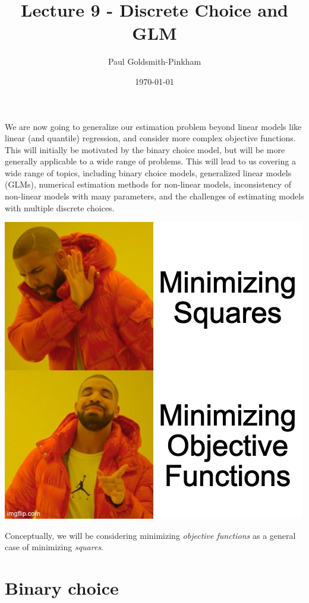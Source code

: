 \documentclass{tufte-handout}
\title{Lecture 9 - Discrete Choice and GLM}
\author{Paul Goldsmith-Pinkham}
\date{\today}
\theoremstyle{break}
\begin{document}
\maketitle


We are now going to generalize our estimation problem beyond linear models like linear (and quantile) regression, and consider more complex objective functions. This will initially be motivated by the binary choice model, but will be more generally applicable to a wide range of problems. This will lead to us covering a wide range of topics, including binary choice models, generalized linear models (GLMs), numerical estimation methods for non-linear models, inconsistency of non-linear models with many parameters, and the challenges of estimating models with multiple discrete choices.

\begin{marginfigure}
    \includegraphics[width=\linewidth]{../lectures/images/drake_minimization.jpg}
\end{marginfigure}    

Conceptually, we will be considering minimizing \emph{objective functions} as a general case of minimizing \emph{squares}.

\section{Binary choice}
  
\end{document}
